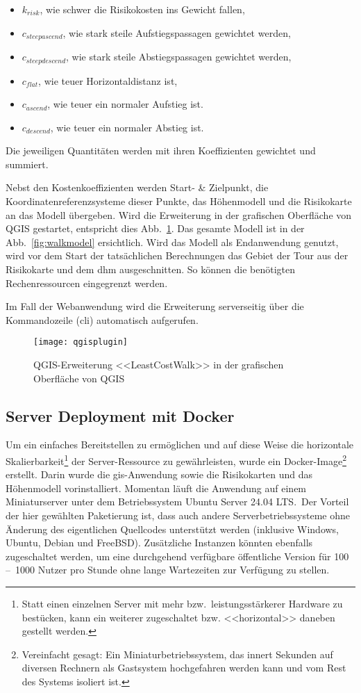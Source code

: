 \begin{itemize}
  \item $k_{risk}$, wie schwer die Risikokosten ins Gewicht fallen,
  \item $c_{steepascend}$, wie stark steile Aufstiegspassagen gewichtet werden,
  \item $c_{steepdescend}$, wie stark steile Abstiegspassagen gewichtet werden,
  \item $c_{flat}$, wie teuer Horizontaldistanz ist,
  \item $c_{ascend}$, wie teuer ein normaler Aufstieg ist.
  \item $c_{descend}$, wie teuer ein normaler Abstieg ist.
\end{itemize}
Die jeweiligen Quantitäten werden mit ihren Koeffizienten gewichtet und summiert.

Nebst den Kostenkoeffizienten werden Start- \& Zielpunkt, die Koordinatenreferenzsysteme dieser Punkte, das Höhenmodell und die Risikokarte an das Modell übergeben. Wird die Erweiterung in der grafischen Oberfläche von QGIS gestartet, entspricht dies Abb.\ \ref{fig:qgisplugin}. Das gesamte Modell ist in der Abb.\ \ref{fig:walkmodel} ersichtlich. Wird das Modell als Endanwendung genutzt, wird vor dem Start der tatsächlichen Berechnungen das Gebiet der Tour aus der Risikokarte und dem \acrshort{dhm} ausgeschnitten. So können die benötigten Rechenressourcen eingegrenzt werden.

Im Fall der Webanwendung wird die Erweiterung serverseitig über die Kommandozeile (\acrshort{cli}) automatisch aufgerufen.

\begin{figure}[H]
  \centering
  \texttt{[image: qgisplugin]}
  \caption{QGIS-Erweiterung <<LeastCostWalk>> in der grafischen Oberfläche von QGIS}\label{fig:qgisplugin}
\end{figure}

\subsection{Server Deployment mit Docker}

Um ein einfaches Bereitstellen zu ermöglichen und auf diese Weise die horizontale Skalierbarkeit\footnote{Statt einen einzelnen Server mit mehr bzw.\ leistungsstärkerer Hardware zu bestücken, kann ein weiterer zugeschaltet bzw. <<horizontal>> daneben gestellt werden.} der Server-Ressource zu gewährleisten, wurde ein Docker-Image\footnote{Vereinfacht gesagt: Ein Miniaturbetriebssystem, das innert Sekunden auf diversen Rechnern als Gastsystem hochgefahren werden kann und vom Rest des Systems isoliert ist.} erstellt. Darin wurde die \gls{gis}-Anwendung sowie die Risikokarten und das Höhenmodell vorinstalliert. Momentan läuft die Anwendung auf einem Miniaturserver unter dem Betriebssystem Ubuntu Server 24.04 LTS.\ Der Vorteil der hier gewählten Paketierung ist, dass auch andere Serverbetriebssysteme ohne Änderung des eigentlichen Quellcodes unterstützt werden (inklusive Windows, Ubuntu, Debian und FreeBSD). Zusätzliche Instanzen könnten ebenfalls zugeschaltet werden, um eine durchgehend verfügbare öffentliche Version für 100 --~1000 Nutzer pro Stunde ohne lange Wartezeiten zur Verfügung zu stellen.


